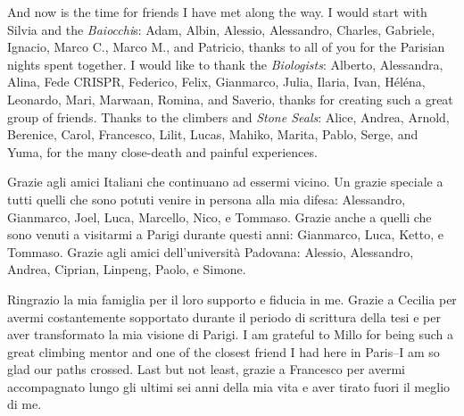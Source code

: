 And now is the time for friends I have met along the way. I would start with Silvia and the \emph{Baiocchi}s:
Adam,
Albin,
Alessio,
Alessandro,
Charles,
Gabriele,
Ignacio,
Marco C.,
Marco M., and
Patricio, thanks to all of you for the Parisian nights spent together.
I would like to thank the \emph{Biologists}:
Alberto,
Alessandra,
Alina,
Fede CRISPR,
Federico,
Felix,
Gianmarco,
Julia,
Ilaria,
Ivan,
Héléna,
Leonardo,
Mari,
Marwaan,
Romina,
and Saverio, thanks for creating such a great group of friends.
Thanks to the climbers and \emph{Stone Seals}:
Alice,
Andrea,
Arnold,
Berenice,
Carol,
Francesco,
Lilit,
Lucas,
Mahiko,
Marita,
Pablo,
Serge,
and Yuma,
for the many close-death and painful experiences.

Grazie agli amici Italiani che continuano ad essermi vicino.
Un grazie speciale a tutti quelli che sono potuti venire in persona alla mia difesa:
Alessandro,
Gianmarco,
Joel,
Luca,
Marcello,
Nico,
e Tommaso.
Grazie anche a quelli che sono venuti a visitarmi a Parigi durante questi anni: Gianmarco, Luca, Ketto, e Tommaso.
Grazie agli amici dell'università Padovana:
Alessio,
Alessandro,
Andrea,
Ciprian,
Linpeng,
Paolo, e
Simone.

Ringrazio la mia famiglia per il loro supporto e fiducia in me. Grazie a Cecilia per avermi costantemente sopportato durante il periodo di scrittura della tesi e per aver transformato la mia visione di Parigi. I am grateful to Millo for being such a great climbing mentor and one of the closest friend I had here in Paris--I am so glad our paths crossed. Last but not least, grazie a Francesco per avermi accompagnato lungo gli ultimi sei anni della mia vita e aver tirato fuori il meglio di me.
